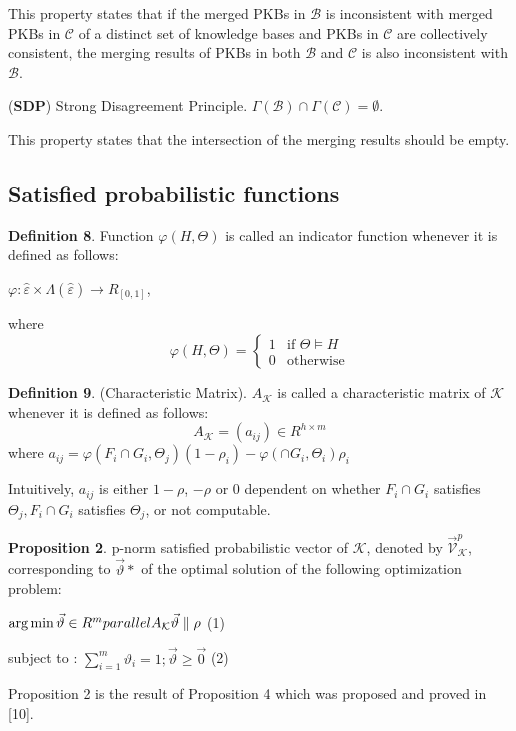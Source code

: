 \documentclass[10pt,a4paper]{IOS-Book-Article}
\begin{document}
This property states that if the merged PKBs in $\mathcal{B}$ is inconsistent with merged PKBs in $\mathcal{C}$ of a distinct set of knowledge bases and PKBs in $\mathcal{C}$ are collectively consistent, the merging results of PKBs in both $\mathcal{B}$ and $\mathcal{C}$ is also inconsistent with $\mathcal{B}$. 

(\textbf{SDP}) Strong Disagreement Principle. $\Gamma(\mathcal{B}) \cap \Gamma(\mathcal{C}) = \emptyset$.

This property states that the intersection of the merging results should be empty.

\subsection{Satisfied probabilistic functions}

\textbf{Definition 8}. Function $\varphi(H,\Theta)$ is called an indicator function whenever it is defined as follows:

$\varphi : \hat{\varepsilon} \times \Lambda(\hat{\varepsilon}) \to R_{[0,1]}$,

where $$\varphi(H,\Theta) =
\begin{cases}
 1	&\text{if $\Theta \models H$} \\
 0	&\text{otherwise}
\end{cases}
$$

\textbf{Definition 9}. (Characteristic Matrix). $A_\mathcal{K}$ is called a characteristic matrix of $\mathcal{K}$ whenever it is defined as follows:
$$
A_\mathcal{K} = (a_{ij}) \in R^{h \times m}
$$
where
$a_{ij} = \varphi(F_i \cap G_i,\Theta_j)(1 − \rho_i) − \varphi(\cap G_i,\Theta_i)\rho_i$

Intuitively, $a_{ij}$ is either $1-\rho$, $-\rho$ or 0 dependent on whether $F_i \cap G_i$ satisfies $\Theta_j, F_i \cap G_i$ satisfies $\Theta_j$, or not computable. 

\textbf{Proposition 2}. p-norm satisfied probabilistic vector of $\mathcal{K}$, denoted by $\vec{\mathcal{V}}^p_\mathcal{K}$, corresponding to $\vec{\vartheta}*$ of the optimal solution of the following optimization problem:

$\arg \min\vec{\vartheta}\in R^m\\parallel A_\mathcal{K} \vec{\vartheta}\parallel\rho$ (1)

subject to : $\sum^m_{i=1}\vartheta_i = 1; \vec{\vartheta}\geq\vec{0}$ (2)

Proposition 2 is the result of Proposition 4 which was proposed and proved in [10]. 
\end{document}
